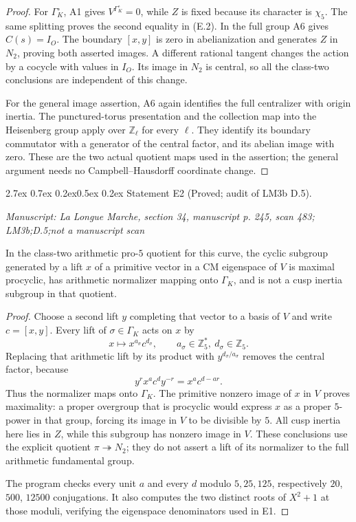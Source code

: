 \documentclass[11pt,a4paper]{article}
\makeatletter
\newcommand{\passage}[1]{\par\smallskip\noindent\textit{Manuscript: #1}\par\smallskip}
\renewcommand\paragraph{\@startsection{paragraph}{4}{\z@}%
  {2.7ex \@plus 0.7ex \@minus 0.2ex}{0.5ex \@plus 0.2ex}%
  {\normalfont\normalsize\bfseries}}
\makeatother
\begin{document}
\begin{proof}
For $\Gamma_K^\circ$, A1 gives $V^{\Gamma_K^\circ}=0$, while $Z$ is fixed because its character is $\chi_5$. The same splitting proves the second equality in (E.2). In the full group A6 gives $C(s)=I_O$. The boundary $[x,y]$ is zero in abelianization and generates $Z$ in $N_2$, proving both asserted images. A different rational tangent changes the action by a cocycle with values in $I_O$. Its image in $N_2$ is central, so all the class-two conclusions are independent of this change.

For the general image assertion, A6 again identifies the full centralizer
with origin inertia. The punctured-torus presentation and the collection
map into the Heisenberg group apply over $\mathbb Z_\ell$ for every
$\ell$. They identify its boundary commutator with a generator of the
central factor, and its abelian image with zero. These are the two actual
quotient maps used in the assertion; the general argument needs no
Campbell--Hausdorff coordinate change.
\end{proof}

\paragraph{Statement E2 (Proved; audit of LM3b D.5).}\label{res:E2}
\passage{La Longue Marche, section 34, manuscript p. 245, scan 483; LM3b;D.5;not a manuscript scan}

In the class-two arithmetic pro-$5$ quotient for this curve, the cyclic subgroup generated by a lift $x$ of a primitive vector in a CM eigenspace of $V$ is maximal procyclic, has arithmetic normalizer mapping onto $\Gamma_K$, and is not a cusp inertia subgroup in that quotient.

\begin{proof}
Choose a second lift $y$ completing that vector to a basis of $V$ and write $c=[x,y]$. Every lift of $\sigma\in\Gamma_K$ acts on $x$ by
\[
 x\longmapsto x^{a_\sigma}c^{d_\sigma},\qquad
 a_\sigma\in\mathbb Z_5^*,\ d_\sigma\in\mathbb Z_5.
\]
Replacing that arithmetic lift by its product with $y^{d_\sigma/a_\sigma}$ removes the central factor, because
\[
 y^r x^a c^d y^{-r}=x^a c^{d-ar}.
\]
Thus the normalizer maps onto $\Gamma_K$. The primitive nonzero image of $x$ in $V$ proves maximality: a proper overgroup that is procyclic would express $x$ as a proper $5$-power in that group, forcing its image in $V$ to be divisible by $5$. All cusp inertia here lies in $Z$, while this subgroup has nonzero image in $V$. These conclusions use the explicit quotient $\pi\twoheadrightarrow N_2$; they do not assert a lift of its normalizer to the full arithmetic fundamental group.

The program checks every unit $a$ and every $d$ modulo $5,25,125$, respectively $20$, $500$, $12500$ conjugations. It also computes the two distinct roots of $X^2+1$ at those moduli, verifying the eigenspace denominators used in E1.
\end{proof}
\end{document}
